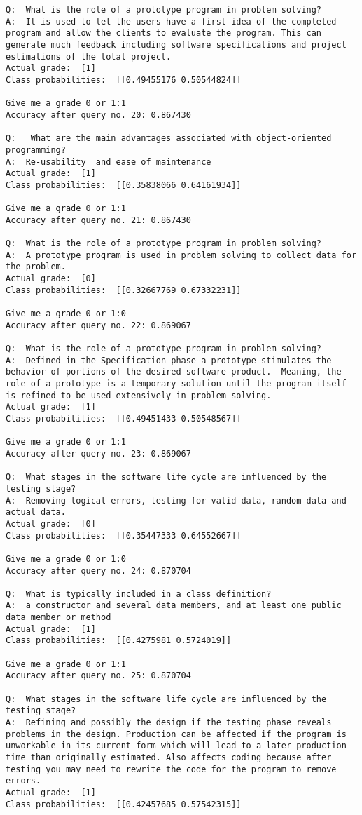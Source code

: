 \documentclass[11pt]{article}
\begin{document}
\begin{Verbatim}[commandchars=\\\{\}]
Q:  What is the role of a prototype program in problem solving?
A:  It is used to let the users have a first idea of the completed program and allow the clients to evaluate the program. This can generate much feedback including software specifications and project estimations of the total project.
Actual grade:  [1]
Class probabilities:  [[0.49455176 0.50544824]]

Give me a grade 0 or 1:1
Accuracy after query no. 20: 0.867430

Q:   What are the main advantages associated with object-oriented programming?
A:  Re-usability  and ease of maintenance
Actual grade:  [1]
Class probabilities:  [[0.35838066 0.64161934]]

Give me a grade 0 or 1:1
Accuracy after query no. 21: 0.867430

Q:  What is the role of a prototype program in problem solving?
A:  A prototype program is used in problem solving to collect data for the problem.
Actual grade:  [0]
Class probabilities:  [[0.32667769 0.67332231]]

Give me a grade 0 or 1:0
Accuracy after query no. 22: 0.869067

Q:  What is the role of a prototype program in problem solving?
A:  Defined in the Specification phase a prototype stimulates the behavior of portions of the desired software product.  Meaning, the role of a prototype is a temporary solution until the program itself is refined to be used extensively in problem solving.
Actual grade:  [1]
Class probabilities:  [[0.49451433 0.50548567]]

Give me a grade 0 or 1:1
Accuracy after query no. 23: 0.869067

Q:  What stages in the software life cycle are influenced by the testing stage?
A:  Removing logical errors, testing for valid data, random data and actual data.
Actual grade:  [0]
Class probabilities:  [[0.35447333 0.64552667]]

Give me a grade 0 or 1:0
Accuracy after query no. 24: 0.870704

Q:  What is typically included in a class definition?
A:  a constructor and several data members, and at least one public data member or method
Actual grade:  [1]
Class probabilities:  [[0.4275981 0.5724019]]

Give me a grade 0 or 1:1
Accuracy after query no. 25: 0.870704

Q:  What stages in the software life cycle are influenced by the testing stage?
A:  Refining and possibly the design if the testing phase reveals problems in the design. Production can be affected if the program is unworkable in its current form which will lead to a later production time than originally estimated. Also affects coding because after testing you may need to rewrite the code for the program to remove errors.
Actual grade:  [1]
Class probabilities:  [[0.42457685 0.57542315]]


\end{Verbatim}
\end{document}
